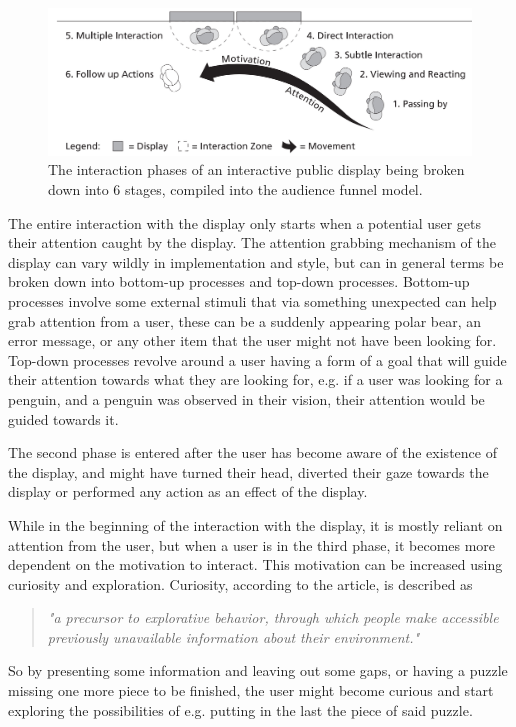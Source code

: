     \begin{figure}[H]
    	\centering
    	\includegraphics[width=0.9\linewidth]{figure/Analysis/AudienceFunnel.png}
    	\caption{The interaction phases of an interactive public display being broken down into 6 stages, compiled into the audience funnel model\cite{interactivePublicDisplays}.}
    	\label{fig:audienceFunnel}
    \end{figure}
    
    The entire interaction with the display only starts when a potential user gets their attention caught by the display. The attention grabbing mechanism of the display can vary wildly in implementation and style, but can in general terms be broken down into bottom-up processes and top-down processes\cite{interactivePublicDisplays}. Bottom-up processes involve some external stimuli that via something unexpected can help grab attention from a user, these can be a suddenly appearing polar bear, an error message, or any other item that the user might not have been looking for\cite{interactivePublicDisplays}. Top-down processes revolve around a user having a form of a goal that will guide their attention towards what they are looking for\cite{interactivePublicDisplays}, e.g. if a user was looking for a penguin, and a penguin was observed in their vision, their attention would be guided towards it.
    
    The second phase is entered after the user has become aware of the existence of the display, and might have turned their head, diverted their gaze towards the display or performed any action as an effect of the display\cite{interactivePublicDisplays}.
    
    While in the beginning of the interaction with the display, it is mostly reliant on attention from the user, but when a user is in the third phase, it becomes more dependent on the motivation to interact\cite{interactivePublicDisplays}. This motivation can be increased using curiosity and exploration\cite{interactivePublicDisplays}. Curiosity, according to the article, is described as 
    \begin{quote}
        \textit{"a precursor to explorative behavior, through which people make accessible previously unavailable information about their environment."}\cite{interactivePublicDisplays}
    \end{quote}
    So by presenting some information and leaving out some gaps, or having a puzzle missing one more piece to be finished, the user might become curious and start exploring the possibilities of e.g. putting in the last the piece of said puzzle\cite{interactivePublicDisplays}.
    

